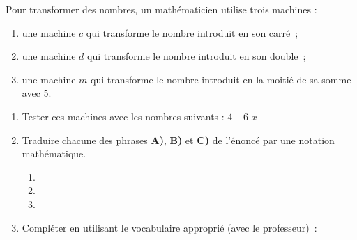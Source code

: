 \documentclass[activite]{thedocument}
\begin{document}
    Pour transformer des nombres, un mathématicien utilise trois machines : 
    \begin{enumerate}
        \item une machine $c$ qui transforme le nombre introduit en son carré~; 
        \item une machine $d$ qui transforme le nombre introduit en son double~; 
        \item une machine $m$ qui transforme le nombre introduit en la moitié de sa somme avec 5. 
    \end{enumerate}
    \begin{enumerate}
        \item Tester ces machines avec les nombres suivants : \hfill $4$ \hfill $-6$ \hfill $x$ \hfill~\par 
        \par\medskip{}
        \item Traduire chacune des phrases {\bfseries A)}, {\bfseries B)} et {\bfseries C)} de
        l'énoncé par une notation mathématique.
        \begin{enumerate}
            \item 
            \item 
            \item 
        \end{enumerate}
        \item Compléter en utilisant le vocabulaire approprié (avec le professeur)~:\par\noindent
        {\centering{}\par}
    \end{enumerate}
    
\end{document}
